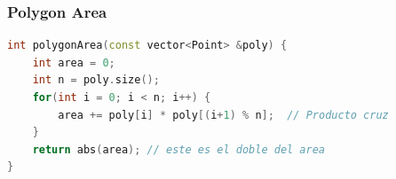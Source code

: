 \subsubsection{Polygon Area}
\begin{lstlisting}[style=mystyle, language=C++]
int polygonArea(const vector<Point> &poly) {
	int area = 0;
	int n = poly.size();
	for(int i = 0; i < n; i++) {
		area += poly[i] * poly[(i+1) % n];  // Producto cruz
	}
	return abs(area); // este es el doble del area
}
\end{lstlisting}
